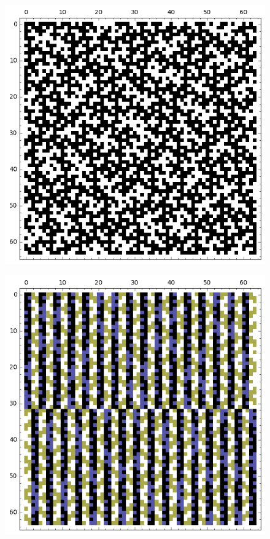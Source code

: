 \documentclass[pdf,sprung,slideColor,nocolorBG]{beamer}
\newenvironment{colortheme}[1]{
\def\ProvidesPackageRCS $##1${\relax}
\renewcommand{\ProcessOptions}{\relax}
\makeatletter

\makeatother
}{}
\begin{document}
\begin{colortheme}{jubata}
\begin{frame}
\begin{figure}
\begin{minipage}{.48\textwidth}
  \centering
  \includegraphics[width=.9\linewidth]{../matrix_plot/re6_3_weight_class_matrix.png}
  \label{fig:6_3_weight_class_matrix}
\end{minipage}%
\begin{minipage}{.48\textwidth}
  \centering
  \includegraphics[width=.9\linewidth]{../matrix_plot/re6_3_bent_cayley_graph_index_matrix.png}

\end{minipage}
\end{figure}
\end{frame}
\end{colortheme}
\end{document}

